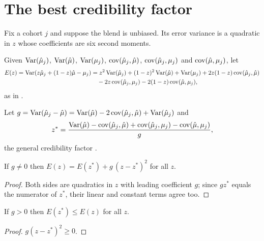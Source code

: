 \chapter{The best credibility factor}\label{ch:blend}

Fix a cohort $j$ and suppose the blend is unbiased. Its error variance is a
quadratic in $z$ whose coefficients are six second moments.

\begin{definition}\label{def:errVar}
  \leanok
  Given $\operatorname{Var}(\hat\mu_j)$, $\operatorname{Var}(\hat\mu)$, $\operatorname{Var}(\mu_j)$, $\operatorname{cov}(\hat\mu_j, \hat\mu)$,
  $\operatorname{cov}(\hat\mu_j, \mu_j)$ and $\operatorname{cov}(\hat\mu, \mu_j)$, let
  \begin{align*}
    E(z) = \operatorname{Var}(z\hat\mu_j + (1-z)\hat\mu - \mu_j)
      &= z^2\operatorname{Var}(\hat\mu_j) + (1-z)^2\operatorname{Var}(\hat\mu) + \operatorname{Var}(\mu_j)
         + 2z(1-z)\operatorname{cov}(\hat\mu_j, \hat\mu) \\
      &\quad - 2z\operatorname{cov}(\hat\mu_j, \mu_j) - 2(1-z)\operatorname{cov}(\hat\mu, \mu_j),
  \end{align*}
  as in .
\end{definition}

\begin{definition}\label{def:bestZ}
  \leanok
  Let $g = \operatorname{Var}(\hat\mu_j - \hat\mu) = \operatorname{Var}(\hat\mu) - 2\operatorname{cov}(\hat\mu_j, \hat\mu) + \operatorname{Var}(\hat\mu_j)$
  and
  \[
    z^* = \frac{\operatorname{Var}(\hat\mu) - \operatorname{cov}(\hat\mu_j, \hat\mu) + \operatorname{cov}(\hat\mu_j, \mu_j) - \operatorname{cov}(\hat\mu, \mu_j)}{g},
  \]
  the general credibility factor .
\end{definition}

\begin{lemma}\label{lem:errVar_eq}
  \leanok
  If $g \neq 0$ then $E(z) = E(z^*) + g\,(z - z^*)^2$ for all $z$.
\end{lemma}
\begin{proof}
  \leanok
  Both sides are quadratics in $z$ with leading coefficient $g$; since
  $g z^*$ equals the numerator of $z^*$, their linear and constant terms
  agree too.
\end{proof}

\begin{theorem}[Eq.\ (7) is optimal]\label{thm:bestZ_optimal}
  \leanok
  If $g > 0$ then $E(z^*) \le E(z)$ for all $z$.
\end{theorem}
\begin{proof}
  \leanok
  $g(z - z^*)^2 \ge 0$.
\end{proof}

